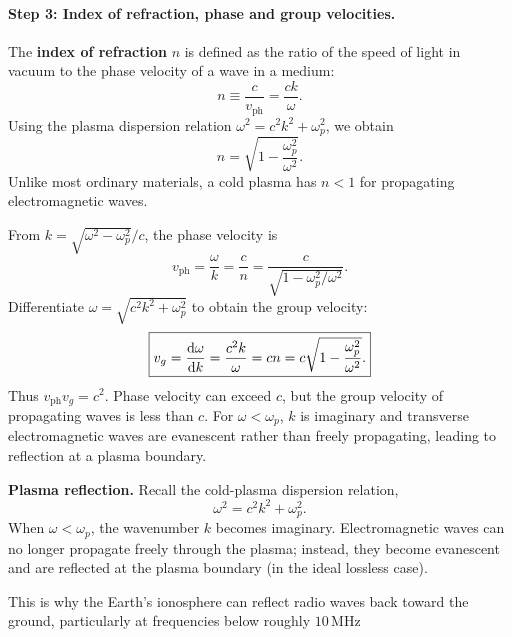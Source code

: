 \documentclass[11pt]{article}
\begin{document}
\paragraph{Step 3: Index of refraction, phase and group velocities.}

The \textbf{index of refraction} $n$ is defined as the ratio of the speed of light in vacuum to the phase velocity of a wave in a medium:
\begin{equation}
\boxed{n\equiv\frac{c}{v_\mathrm{ph}}=\frac{ck}{\omega}.}
\end{equation}
Using the plasma dispersion relation $\omega^2=c^2k^2+\omega_p^2$, we obtain
\begin{equation}
\boxed{n=\sqrt{1-\frac{\omega_p^2}{\omega^2}}.}
\end{equation}
Unlike most ordinary materials, a cold plasma has $n<1$ for propagating electromagnetic waves.

From $k=\sqrt{\omega^2-\omega_p^2}/c$, the phase velocity is
\begin{equation}
\boxed{v_\mathrm{ph}=\frac{\omega}{k}
=\frac{c}{n}
=\frac{c}{\sqrt{1-\omega_p^2/\omega^2}}.}
\end{equation}
Differentiate $\omega=\sqrt{c^2k^2+\omega_p^2}$ to obtain the group velocity:
\begin{equation}
\boxed{v_g=\dv{\omega}{k}=\frac{c^2k}{\omega}
=cn=c\sqrt{1-\frac{\omega_p^2}{\omega^2}}.}
\end{equation}
Thus $v_\mathrm{ph}v_g=c^2$. Phase velocity can exceed $c$, but the group velocity of propagating waves is less than $c$. For $\omega<\omega_p$, $k$ is imaginary and transverse electromagnetic waves are evanescent rather than freely propagating, leading to reflection at a plasma boundary.


\textbf{Plasma reflection.}
Recall the cold-plasma dispersion relation,
\begin{equation}
\omega^2=c^2k^2+\omega_p^2.
\end{equation}
When $\omega<\omega_p$, the wavenumber $k$ becomes imaginary.
Electromagnetic waves can no longer propagate freely through the plasma;
instead, they become evanescent and are reflected at the plasma boundary
(in the ideal lossless case).

This is why the Earth's ionosphere can reflect radio waves back toward
the ground, particularly at frequencies below roughly $10\,\mathrm{MHz}$
\end{document}

